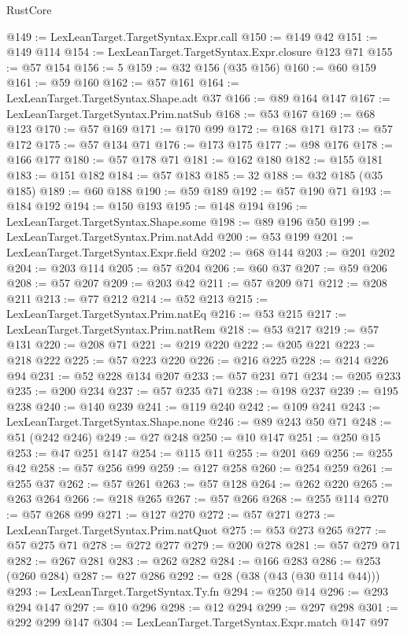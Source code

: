 \begin{lexlean}{RustCore}
\begin{coremodule}
@149 := LexLeanTarget.TargetSyntax.Expr.call
@150 := @149 @42
@151 := @149 @114
@154 := LexLeanTarget.TargetSyntax.Expr.closure @123 @71
@155 := @57 @154
@156 := 5
@159 := @32 @156 (@35 @156)
@160 := @60 @159
@161 := @59 @160
@162 := @57 @161
@164 := LexLeanTarget.TargetSyntax.Shape.adt @37
@166 := @89 @164 @147
@167 := LexLeanTarget.TargetSyntax.Prim.natSub
@168 := @53 @167
@169 := @68 @123
@170 := @57 @169
@171 := @170 @99
@172 := @168 @171
@173 := @57 @172
@175 := @57 @134 @71
@176 := @173 @175
@177 := @98 @176
@178 := @166 @177
@180 := @57 @178 @71
@181 := @162 @180
@182 := @155 @181
@183 := @151 @182
@184 := @57 @183
@185 := 32
@188 := @32 @185 (@35 @185)
@189 := @60 @188
@190 := @59 @189
@192 := @57 @190 @71
@193 := @184 @192
@194 := @150 @193
@195 := @148 @194
@196 := LexLeanTarget.TargetSyntax.Shape.some
@198 := @89 @196 @50
@199 := LexLeanTarget.TargetSyntax.Prim.natAdd
@200 := @53 @199
@201 := LexLeanTarget.TargetSyntax.Expr.field
@202 := @68 @144
@203 := @201 @202
@204 := @203 @114
@205 := @57 @204
@206 := @60 @37
@207 := @59 @206
@208 := @57 @207
@209 := @203 @42
@211 := @57 @209 @71
@212 := @208 @211
@213 := @77 @212
@214 := @52 @213
@215 := LexLeanTarget.TargetSyntax.Prim.natEq
@216 := @53 @215
@217 := LexLeanTarget.TargetSyntax.Prim.natRem
@218 := @53 @217
@219 := @57 @131
@220 := @208 @71
@221 := @219 @220
@222 := @205 @221
@223 := @218 @222
@225 := @57 @223 @220
@226 := @216 @225
@228 := @214 @226 @94
@231 := @52 @228 @134 @207
@233 := @57 @231 @71
@234 := @205 @233
@235 := @200 @234
@237 := @57 @235 @71
@238 := @198 @237
@239 := @195 @238
@240 := @140 @239
@241 := @119 @240
@242 := @109 @241
@243 := LexLeanTarget.TargetSyntax.Shape.none
@246 := @89 @243 @50 @71
@248 := @51 (@242 @246)
@249 := @27 @248
@250 := @10 @147
@251 := @250 @15
@253 := @47 @251 @147
@254 := @115 @11
@255 := @201 @69
@256 := @255 @42
@258 := @57 @256 @99
@259 := @127 @258
@260 := @254 @259
@261 := @255 @37
@262 := @57 @261
@263 := @57 @128
@264 := @262 @220
@265 := @263 @264
@266 := @218 @265
@267 := @57 @266
@268 := @255 @114
@270 := @57 @268 @99
@271 := @127 @270
@272 := @57 @271
@273 := LexLeanTarget.TargetSyntax.Prim.natQuot
@275 := @53 @273 @265
@277 := @57 @275 @71
@278 := @272 @277
@279 := @200 @278
@281 := @57 @279 @71
@282 := @267 @281
@283 := @262 @282
@284 := @166 @283
@286 := @253 (@260 @284)
@287 := @27 @286
@292 := @28 (@38 (@43 (@30 @114 @44)))
@293 := LexLeanTarget.TargetSyntax.Ty.fn
@294 := @250 @14
@296 := @293 @294 @147
@297 := @10 @296
@298 := @12 @294
@299 := @297 @298
@301 := @292 @299 @147
@304 := LexLeanTarget.TargetSyntax.Expr.match @147 @97

\end{coremodule}
\end{lexlean}
